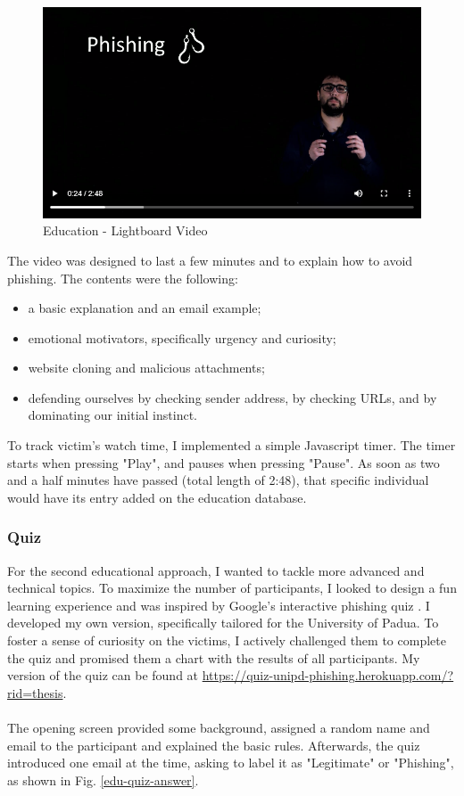 \documentclass[a4paper]{article}
\begin{document}
\begin{figure}[H]
	\centering
	\includegraphics[width=\linewidth]{images/education/video.PNG}
	\caption{Education - Lightboard Video}
	\label{edu-video}
\end{figure}

\noindent
The video was designed to last a few minutes and to explain how to avoid phishing. The contents were the following:

\begin{itemize}
    \item a basic explanation and an email example;
    \item emotional motivators, specifically urgency and curiosity;
    \item website cloning and malicious attachments;
    \item defending ourselves by checking sender address, by checking URLs, and by dominating our initial instinct.
\end{itemize}

To track victim's watch time, I implemented a simple Javascript timer. The timer starts when pressing "Play", and pauses when pressing "Pause". As soon as two and a half minutes have passed (total length of 2:48), that specific individual would have its entry added on the education database.

\subsubsection{Quiz}

\noindent
For the second educational approach, I wanted to tackle more advanced and technical topics. To maximize the number of participants, I looked to design a fun learning experience and was inspired by Google's interactive phishing quiz \cite{tools-google-phishing-quiz}. I developed my own version, specifically tailored for the University of Padua. To foster a sense of curiosity on the victims, I actively challenged them to complete the quiz and promised them a chart with the results of all participants. My version of the quiz can be found at \url{https://quiz-unipd-phishing.herokuapp.com/?rid=thesis}.
\\ \\
The opening screen provided some background, assigned a random name and email to the participant and explained the basic rules. Afterwards, the quiz introduced one email at the time, asking to label it as "Legitimate" or "Phishing", as shown in Fig. \ref{edu-quiz-answer}.
\end{document}
